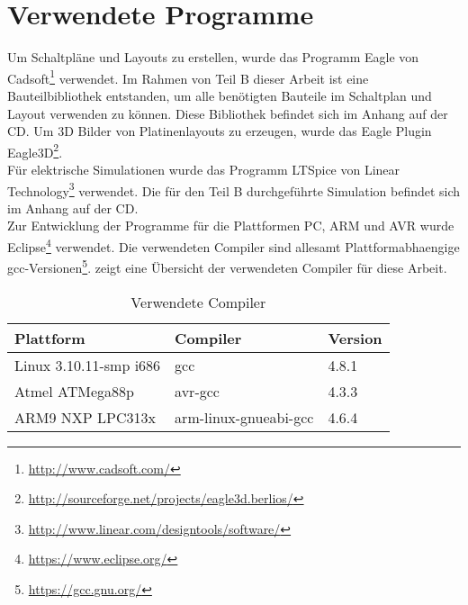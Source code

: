 \section{Verwendete Programme}
Um Schaltpläne und Layouts zu erstellen, wurde das Programm Eagle von Cadsoft\footnote{\url{http://www.cadsoft.com/}} verwendet. Im Rahmen von Teil B dieser Arbeit ist eine Bauteilbibliothek entstanden, um alle benötigten Bauteile im Schaltplan und Layout verwenden zu können. Diese Bibliothek befindet sich im Anhang auf der CD.
Um 3D Bilder von Platinenlayouts zu erzeugen, wurde das Eagle Plugin Eagle3D\footnote{\url{http://sourceforge.net/projects/eagle3d.berlios/}}.\\
Für elektrische Simulationen wurde das Programm LTSpice von Linear Technology\footnote{\url{http://www.linear.com/designtools/software/}} verwendet. Die für den Teil B durchgeführte Simulation befindet sich im Anhang auf der CD.\\
Zur Entwicklung der Programme für die Plattformen PC, ARM und AVR wurde Eclipse\footnote{\url{https://www.eclipse.org/}} verwendet. Die verwendeten Compiler sind allesamt Plattformabhaengige gcc-Versionen\footnote{\url{https://gcc.gnu.org/}}.  zeigt eine Übersicht der verwendeten Compiler für diese Arbeit.

\begin{table}[h]
\begin{tabular}{|p{4.5cm}|p{4cm}|p{4cm}|}\hline
\rowcolor{TableBackgroundColor} 
\textbf{Plattform}		&	\textbf{Compiler}		&	\textbf{Version}  \\ \hline
 Linux 3.10.11-smp i686	&	gcc						& 4.8.1	\\ \hline
 Atmel ATMega88p		&	avr-gcc					& 4.3.3	\\ \hline
 ARM9 NXP LPC313x		&	arm-linux-gnueabi-gcc	& 4.6.4	\\ \hline
\end{tabular}
\caption{Verwendete Compiler}
\label{tab:verwendete_compiler}
\end{table}



